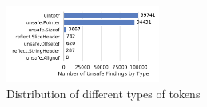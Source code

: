 \begin{figure}[!t]
    \centering
    \includegraphics[width=0.45\textwidth]{gfx/figures/distribution-unsafe-types.pdf}
    \caption{Distribution of different types of \unsafe{} tokens}
    \label{fig:unsafe-tokens-distribution}
\end{figure}